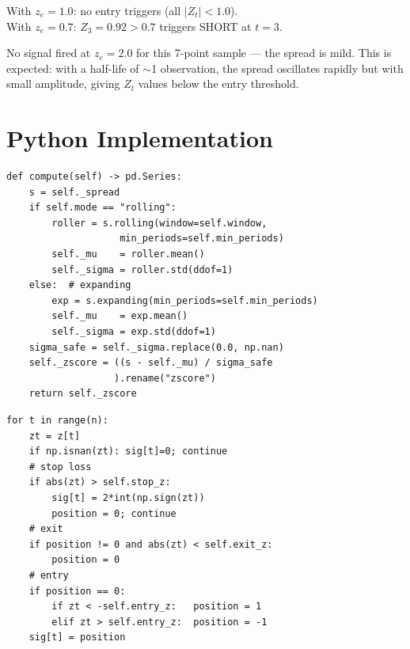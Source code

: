 \documentclass[10pt,a4paper,twocolumn]{article}
\begin{document}
\noindent With $z_e=1.0$: no entry triggers (all $|Z_t|<1.0$).\\
With $z_e=0.7$: $Z_3=0.92>0.7$ triggers SHORT at $t=3$.

\begin{tcolorbox}[resultbox={Interpretation}]
No signal fired at $z_e=2.0$ for this 7-point sample ---
the spread is mild.  This is expected: with a half-life of $\sim$1
observation, the spread oscillates rapidly but with small amplitude,
giving $Z_t$ values below the entry threshold.
\end{tcolorbox}

\section{Python Implementation}

\begin{tcolorbox}[codebox={Z-score computation}]
\begin{lstlisting}[style=pythonplain]
def compute(self) -> pd.Series:
    s = self._spread
    if self.mode == "rolling":
        roller = s.rolling(window=self.window,
                    min_periods=self.min_periods)
        self._mu    = roller.mean()
        self._sigma = roller.std(ddof=1)
    else:  # expanding
        exp = s.expanding(min_periods=self.min_periods)
        self._mu    = exp.mean()
        self._sigma = exp.std(ddof=1)
    sigma_safe = self._sigma.replace(0.0, np.nan)
    self._zscore = ((s - self._mu) / sigma_safe
                   ).rename("zscore")
    return self._zscore
\end{lstlisting}
\end{tcolorbox}

\begin{tcolorbox}[codebox={State-machine signal (inner loop)}]
\begin{lstlisting}[style=pythonplain]
for t in range(n):
    zt = z[t]
    if np.isnan(zt): sig[t]=0; continue
    # stop loss
    if abs(zt) > self.stop_z:
        sig[t] = 2*int(np.sign(zt))
        position = 0; continue
    # exit
    if position != 0 and abs(zt) < self.exit_z:
        position = 0
    # entry
    if position == 0:
        if zt < -self.entry_z:   position = 1
        elif zt > self.entry_z:  position = -1
    sig[t] = position
\end{lstlisting}
\end{tcolorbox}
\end{document}
